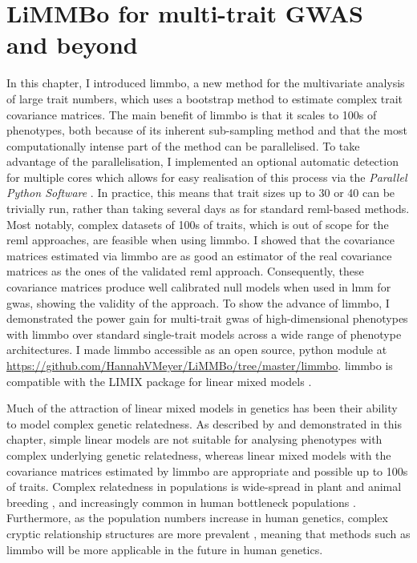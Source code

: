\section{LiMMBo for multi-trait GWAS and beyond}
In this chapter, I introduced \gls{limmbo}, a new method for the multivariate analysis of large trait numbers, which uses a bootstrap method to estimate complex trait covariance matrices. The main benefit of \gls{limmbo} is that it scales to \num{100}s of phenotypes, both because of its inherent sub-sampling method and that the most computationally intense part of the method can be parallelised. To take advantage of the parallelisation, I implemented an optional automatic detection for multiple cores which allows for easy realisation of this process via the \textit{Parallel Python Software} \citep{PPSoftware}. In practice, this means that trait sizes up to 30 or 40 can be trivially run, rather than taking several days as for standard \gls{reml}-based methods. Most notably, complex datasets of \num{100}s of traits, which is out of scope for the \gls{reml} approaches, are feasible when using \gls{limmbo}. I showed that the covariance matrices estimated via \gls{limmbo} are as good an estimator of the real covariance matrices as the ones of the validated \gls{reml} approach. Consequently, these covariance matrices produce well calibrated null models when used in \gls{lmm} for \gls{gwas}, showing the validity of the approach. To show the advance of \gls{limmbo}, I demonstrated the power gain for multi-trait \gls{gwas} of high-dimensional phenotypes with \gls{limmbo} over standard single-trait models across a wide range of phenotype architectures. I made \gls{limmbo} accessible as an open source, python module at \url{https://github.com/HannahVMeyer/LiMMBo/tree/master/limmbo}. \gls{limmbo} is compatible with the LIMIX package for linear mixed models \citep{Lippert2014}.  

Much of the attraction of linear mixed models in genetics has been their ability to model complex genetic relatedness. As described by \citep{Kang2010} and demonstrated in this chapter, simple linear models are not suitable for analysing phenotypes with complex underlying genetic relatedness, whereas linear mixed models with the covariance matrices estimated by \gls{limmbo} are appropriate and possible up to \num{100}s of traits. Complex relatedness in populations is wide-spread in plant and animal breeding \citep{Bolormaa2014,Yang2014}, and increasingly common in human bottleneck populations \citep{Tachmazidou2013}. Furthermore, as the population numbers increase in human genetics, complex cryptic relationship structures are more prevalent \citep{Reich2001}, meaning that methods such as \gls{limmbo} will be more applicable in the future in human genetics. 

